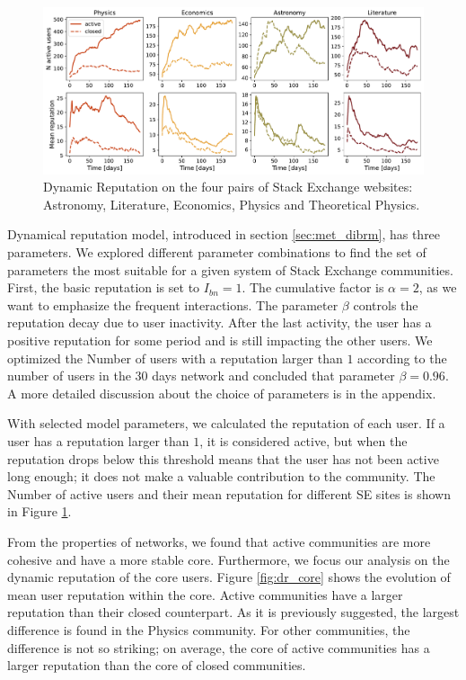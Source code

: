 \begin{figure}[h]
	\centering
	\includegraphics[width=\linewidth]{figures/stackexchange/reputation.pdf}
	\caption[Dynamic Reputation of Stack Exchange websites.]{Dynamic Reputation on the four pairs of Stack Exchange websites: Astronomy, Literature, Economics,  Physics and Theoretical Physics.}
	\label{fig:dr6panel}
\end{figure}

Dynamical reputation model, introduced in section \ref{sec:met_dibrm}, has three parameters. We explored different parameter combinations to find the set of parameters the most suitable for a given system of Stack Exchange communities. First, the basic reputation is set to $I_{bn}=1$. The cumulative factor is $\alpha=2$, as we want to emphasize the frequent interactions. The parameter $\beta$ controls the reputation decay due to user inactivity. After the last activity, the user has a positive reputation for some period and is still impacting the other users. We optimized the Number of users with a reputation larger than $1$ according to the number of users in the 30 days network and concluded that parameter $\beta=0.96$. A more detailed discussion about the choice of parameters is in the appendix. 

With selected model parameters, we calculated the reputation of each user. If a user has a reputation larger than $1$, it is considered active, but when the reputation drops below this threshold means that the user has not been active long enough; it does not make a valuable contribution to the community. The Number of active users and their mean reputation for different SE sites is shown in Figure \ref{fig:dr6panel}. 

From the properties of networks, we found that active communities are more cohesive and have a more stable core. Furthermore, we focus our analysis on the dynamic reputation of the core users. Figure \ref{fig:dr_core} shows the evolution of mean user reputation within the core. Active communities have a larger reputation than their closed counterpart. As it is previously suggested, the largest difference is found in the Physics community. For other communities, the difference is not so striking; on average, the core of active communities has a larger reputation than the core of closed communities. 

